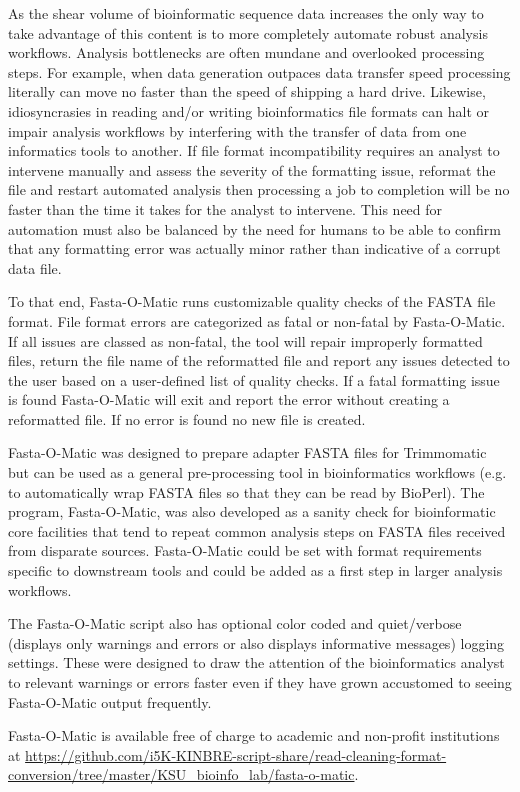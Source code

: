 As the shear volume of bioinformatic sequence data increases the only way to take advantage of this content is to more completely automate robust analysis workflows. Analysis bottlenecks are often mundane and overlooked processing steps. For example, when data generation outpaces data transfer speed processing literally can move no faster than the speed of shipping a hard drive. Likewise, idiosyncrasies in reading and/or writing bioinformatics file formats can halt or impair analysis workflows by interfering with the transfer of data from one informatics tools to another. If file format incompatibility requires an analyst to intervene manually and assess the severity of the formatting issue, reformat the file and restart automated analysis then processing a job to completion will be no faster than the time it takes for the analyst to intervene. This need for automation must also be balanced by the need for humans to be able to confirm that any formatting error was actually minor rather than indicative of a corrupt data file. 

To that end, Fasta-O-Matic runs customizable quality checks of the FASTA file format. File format errors are categorized as fatal or non-fatal by Fasta-O-Matic.  If all issues are classed as non-fatal, the tool will repair improperly formatted files, return the file name of the reformatted file and report any issues detected to the user based on a user-defined list of quality checks. If a fatal formatting issue is found Fasta-O-Matic will exit and report the error without creating a reformatted file. If no error is found no new file is created.

Fasta-O-Matic was designed to prepare adapter FASTA files for Trimmomatic but can be used as a general pre-processing tool in bioinformatics workflows (e.g. to automatically wrap FASTA files so that they can be read by BioPerl). The program, Fasta-O-Matic, was also developed as a sanity check for bioinformatic core facilities that tend to repeat common analysis steps on FASTA files received from disparate sources. Fasta-O-Matic could be set with format requirements specific to downstream tools and could be added as a first step in larger analysis workflows.

The Fasta-O-Matic script also has optional color coded and quiet/verbose (displays only warnings and errors or also displays informative messages) logging settings. These were designed to draw the attention of the bioinformatics analyst to relevant warnings or errors faster even if they have grown accustomed to seeing Fasta-O-Matic output frequently.

Fasta-O-Matic is available free of charge to academic and non-profit institutions at \url{https://github.com/i5K-KINBRE-script-share/read-cleaning-format-conversion/tree/master/KSU\_bioinfo\_lab/fasta-o-matic}.
  
  